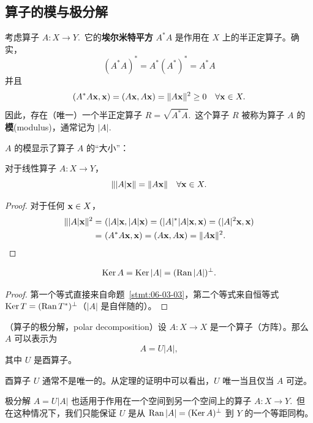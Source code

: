 \subsection{算子的模与极分解}\label{sec:06-03-02}
考虑算子 $A: X \to Y$.~它的\textbf{埃尔米特平方} $A^*A$ 是作用在 $X$ 上的半正定算子。确实，$$(A^*A)^* = A^*(A^*)^* = A^*A$$
并且 $$(A^*A\mathbf{x}, \mathbf{x}) = (A\mathbf{x}, A\mathbf{x}) = \|A\mathbf{x}\|^2 \geq 0 \quad \forall \mathbf{x} \in X.$$
因此，存在（唯一）一个半正定算子 $R = \sqrt{A^*A}$.~这个算子 $R$ 被称为算子 $A$ 的\textbf{模}(modulus)，通常记为 $|A|$.~

$A$ 的模显示了算子 $A$ 的“大小”：

\begin{proposition}\label{stmt:06-03-03}
对于线性算子 $A: X \to Y$，
$$\| |A| \mathbf{x} \| = \|A\mathbf{x}\| \quad \forall \mathbf{x} \in X.$$
\end{proposition}

\begin{proof}对于任何 $\mathbf{x} \in X$，
\begin{equation} \notag
\begin{split}
\| |A| \mathbf{x} \|^2 =&\  (|A|\mathbf{x}, |A|\mathbf{x}) = (|A|^*|A|\mathbf{x}, \mathbf{x}) = ( |A|^2 \mathbf{x}, \mathbf{x} )  \\
=&\    (A^*A\mathbf{x}, \mathbf{x}) = (A\mathbf{x}, A\mathbf{x}) = \|A\mathbf{x}\|^2.
\end{split}
\end{equation}\end{proof}

\begin{corollary}\label{stmt:06-03-04}
$$\operatorname{Ker} A = \operatorname{Ker} |A| = (\operatorname{Ran} |A|)^\perp.$$
\end{corollary}

\begin{proof}第一个等式直接来自命题~\ref{stmt:06-03-03}，第二个等式来自恒等式 $\operatorname{Ker} T = (\operatorname{Ran} T^*)^\perp$（$|A|$ 是自伴随的）。\end{proof}

\begin{theorem}\label{stmt:06-03-05} （算子的极分解，polar decomposition）设 $A: X \to X$ 是一个算子（方阵）。那么 $A$ 可以表示为
$$A = U|A|,$$
其中 $U$ 是酉算子。\end{theorem}

\begin{remark*}
酉算子 $U$ 通常不是唯一的。从定理的证明中可以看出，$U$ 唯一当且仅当 $A$ 可逆。
\end{remark*}

\begin{remark*}
极分解 $A = U|A|$ 也适用于作用在一个空间到另一个空间上的算子 $A: X \to Y$.~但在这种情况下，我们只能保证 $U$ 是从 $\operatorname{Ran} |A| = (\operatorname{Ker} A)^\perp$ 到 $Y$ 的一个等距同构。
\end{remark*}

